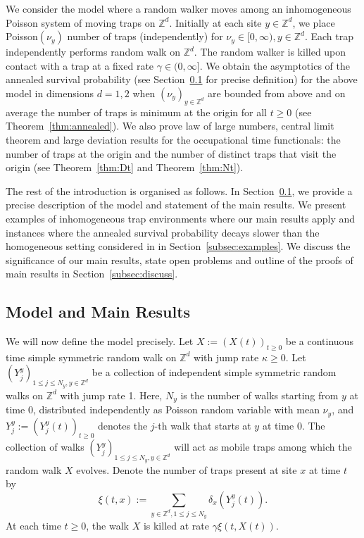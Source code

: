 \documentclass{article}[12pt]
\theoremstyle{definition}
\newcommand{\Z}{\mathbb{Z}}
\newcommand{\1}{\mathbbm{1}}
\begin{document}
We consider the model where a random walker moves among an inhomogeneous Poisson system of moving traps on $\Z^d$. Initially at each site $y\in \Z^d$, we place Poisson$(\nu_y)$ number of traps (independently) for $\nu_y\in [0,\infty), y\in \Z^d$. Each trap independently performs random walk on $\Z^d$. The random walker is killed upon contact with a trap at a fixed rate $\gamma\in (0,\infty]$. We obtain the asymptotics of the annealed survival probability (see Section~\ref{subsec:model} for precise definition) for the above model in dimensions $d=1,2$ when $(\nu_y)_{y\in \Z^d}$  are bounded from above and on average the number of traps is minimum at the origin for all $t\ge 0$ (see Theorem~\ref{thm:annealed}).  We also prove law of large numbers, central limit theorem and large deviation results for the occupational time functionals: the number of traps at the origin and the number of distinct traps that visit the origin (see Theorem~\ref{thm:Dt} and Theorem~\ref{thm:Nt}).

The rest of the introduction is organised as follows. In Section~\ref{subsec:model}, we provide a precise description of the model and statement of the main results.
We present examples of inhomogeneous trap environments where our main results apply and instances where the annealed survival probability decays slower than the homogeneous setting considered in \cite{DGRS2012} in Section~\ref{subsec:examples}. We 
discuss the significance of our main results, state open problems and outline of the proofs of main results in Section~\ref{subsec:discuss}. 

\subsection{Model and Main Results}
\label{subsec:model}
We will now define the model precisely. Let $X := (X (t))_{t \geq 0}$ be a continuous time simple symmetric random walk  on $\mathbb{Z}^d$ with jump rate $\kappa \geq 0$. Let $(Y_j^y)_{1 \leq j \leq N_y, y \in \mathbb{Z}^d}$ be a collection of independent simple symmetric random walks on $\mathbb{Z}^d$ with jump rate 1. Here, $N_y$ is the number of walks starting from $y$ at time $0$, distributed independently as Poisson random variable with mean $\nu_y$, and $Y_j^y := (Y_j^y (t))_{t \geq 0}$ denotes the $j$-th walk that starts at $y$ at time $0$. The collection of walks $(Y_j^y)_{1 \leq j \leq N_y, y \in \mathbb{Z}^d}$ will act as mobile traps among which the random walk $X$ evolves. Denote the number of traps present at site $x$ at time $t$ by
\begin{equation}
  \xi (t, x) := \sum_{y \in {\mathbb{Z}^d}, 1 \leq j \leq N_y}
  \delta_x  (Y_j^y (t)). \label{randomfield}
\end{equation}
At each time $t\ge 0$, the walk $X$ is killed at rate $\gamma\xi(t,X(t))$.
\end{document}
